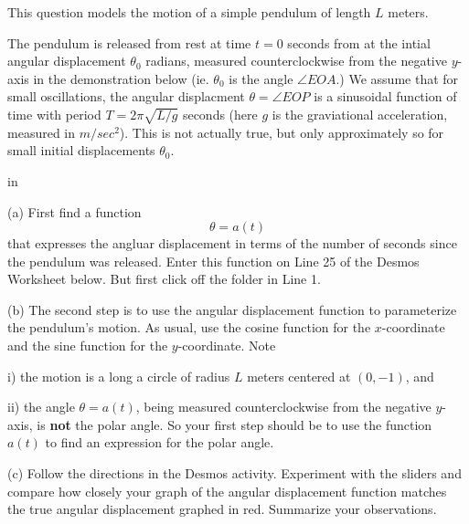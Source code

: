 \documentclass{ximera}
\newcommand{\pskip}{\vskip 0.1 in}
\begin{document}
\begin{question}   \label{Q30:InverseTrig}
This question models the motion of a simple pendulum of length $L$ meters. 

The pendulum is released from rest at time $t=0$ seconds from at the intial angular displacement $\theta_0$ radians, measured counterclockwise from the negative $y$-axis in the demonstration below (ie. $\theta_0$ is the angle $\angle EOA$.)  We assume that for small oscillations, the angular displacment $\theta = \angle EOP$ is a sinusoidal function of time with period $T=2\pi \sqrt{L/g}$ seconds (here $g$ is the graviational acceleration, measured in $m/sec^2$). This is not actually true, but only approximately so for small initial displacements $\theta_0$. 

\pskip

(a) First find a function 
\[
   \theta = a(t) 
\]
that expresses the angluar displacement in terms of the number of seconds since the pendulum was released. Enter this function on Line 25 of the Desmos Worksheet below. But first click off the folder in Line 1.

(b) The second step is to use the angular displacement function to parameterize the pendulum's motion. As usual, use the cosine function for the $x$-coordinate and the sine function for the $y$-coordinate. Note 

i) the motion is a long a circle of radius $L$ meters centered at $(0,-1)$, and

ii) the angle $\theta = a(t)$, being measured counterclockwise from the negative $y$-axis,  is {\bf not} the polar angle. So your first step should be to use the function $a(t)$ to find an expression for the polar angle.

(c) Follow the directions in the Desmos activity. Experiment with the sliders and compare how closely your graph of the angular displacement function matches the true angular displacement graphed in red. Summarize your observations.


\begin{exploration}\label{Exp3:Comp}

 
\begin{onlineOnly}
    \begin{center}
\end{center}
\end{onlineOnly}
\end{exploration}

\end{question}
\end{document}
